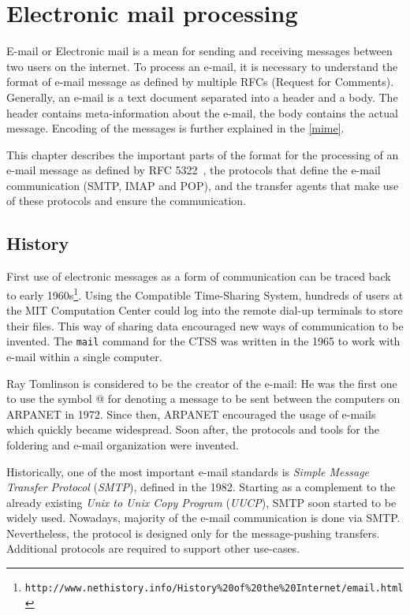 \chapter{Electronic mail processing}
\label{mailprocess}
E-mail or Electronic mail is a mean for sending and receiving messages between two users on the internet. To process an e-mail, it is necessary to understand the format of e-mail message as defined by multiple RFCs (Request for Comments). Generally, an e-mail is a text document separated into a header and a body. The header contains meta-information about the e-mail, the body contains the actual message. Encoding of the messages is further explained in the 
\autoref{mime}.

This chapter describes the important parts of the format for the processing of an e-mail message as defined by RFC 5322~\cite{rfc5322}, the protocols that define the e-mail communication (SMTP, IMAP and POP), and the transfer agents that make use of these protocols and ensure the communication.

\section{History}
First use of electronic messages as a form of communication can be traced back to early 1960s\footnote{\texttt{http://www.nethistory.info/History\%20of\%20the\%20Internet/email.html}}. Using the Compatible Time-Sharing System, hundreds of users at the MIT Computation Center could log into the remote dial-up terminals to store their files.
This way of sharing data encouraged new ways of communication to be invented. The \texttt{mail} command for the CTSS was written in the 1965 to work with e-mail within a single computer.

Ray Tomlinson is considered to be the creator of the e-mail: He was the first one to use the symbol @ for denoting a message to be sent between the computers on ARPANET in 1972. Since then, ARPANET encouraged the usage of e-mails which quickly became widespread. Soon after, the protocols and tools for the foldering and e-mail organization were invented.

Historically, one of the most important e-mail standards is \emph{Simple Message Transfer Protocol} (\emph{SMTP}), defined in the 1982. Starting as a complement to the already existing \emph{Unix to Unix Copy Program} (\emph{UUCP}), SMTP soon started to be widely used. Nowadays, majority of the e-mail communication is done via SMTP.  Nevertheless, the protocol is designed only for the message-pushing transfers. Additional protocols are required to support other use-cases.

